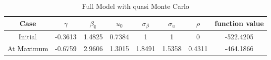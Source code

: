 \documentclass[10pt, letterpaper]{article}
\begin{document}
\begin{table}[h!]
  \begin{center}
    \caption{Full Model with quasi Monte Carlo}  
    \label{tab:start}
    \begin{tabular}{c|cccccc|c} %
      \hline\hline
       Case            &$ \gamma  $&$  \beta_{0} $&$   u_{0}  $&$ \sigma_{\beta} $&$ \sigma_{u}  $&$ \rho $& function value\\
      \hline   
       Initial         & -0.3613  &  1.4825      &  0.7384    &    1            &     1         &    0     &  -522.4205    \\ 
       At Maximum      & -0.6759  &  2.9606      &  1.3015    &    1.8491       &  1.5358       &  0.4311  &  -464.1866    \\ 
      \hline      \hline
    \end{tabular}
  \end{center}
\end{table} 


\clearpage
\end{document}
